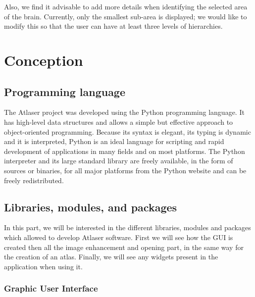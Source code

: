 \documentclass[a4paper,12pt]{report}
\begin{document}
Also, we find it advisable to add more details when identifying the selected area of the brain. Currently, only the smallest sub-area is displayed; we would like to modify this so that the user can have at least three levels of hierarchies.\\


\chapter{Conception}{\setcounter{tocdepth}{1}} 
\section{Programming language}
The Atlaser project was developed using the Python programming language. It has high-level data structures and allows a simple but effective approach to object-oriented programming. Because its syntax is elegant, its typing is dynamic and it is interpreted, Python is an ideal language for scripting and rapid development of applications in many fields and on most platforms. The Python interpreter and its large standard library are freely available, in the form of sources or binaries, for all major platforms from the Python website \cite{python} and can be freely redistributed.\\

\section{Libraries, modules, and packages}
In this part, we will be interested in the different libraries, modules and packages which allowed to develop Atlaser software. First we will see how the GUI is created then all the image enhancement and opening part, in the same way for the creation of an atlas. Finally, we will see any widgets present in the application when using it.\\

\subsection{Graphic User Interface}
\end{document}
